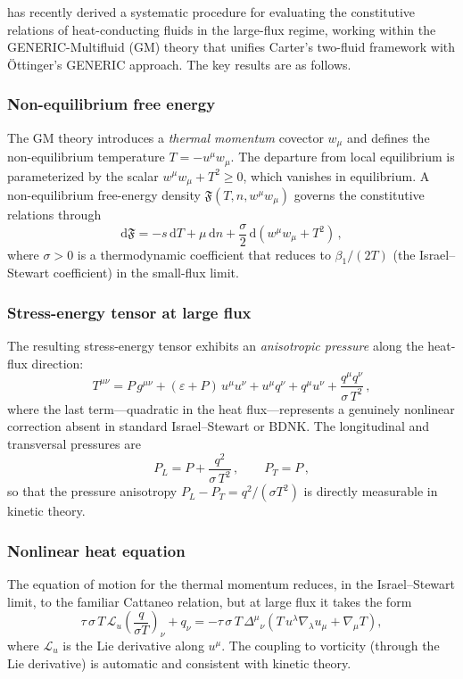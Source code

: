 \citet{GavassinoLargeFlux2024} has recently derived a systematic
procedure for evaluating the constitutive relations of heat-conducting
fluids in the large-flux regime, working within the GENERIC-Multifluid
(GM) theory that unifies Carter's two-fluid framework with
\"Ottinger's GENERIC approach.  The key results are as follows.

\subsubsection{Non-equilibrium free energy}
The GM theory introduces a \emph{thermal momentum} covector $w_\mu$
and defines the non-equilibrium temperature $T = -u^\mu w_\mu$.  The
departure from local equilibrium is parameterized by the scalar
$w^\mu w_\mu + T^2 \ge 0$, which vanishes in equilibrium.  A
non-equilibrium free-energy density $\mathfrak{F}(T, n, w^\mu w_\mu)$
governs the constitutive relations through
\begin{equation}
  \mathrm{d}\mathfrak{F}
  = -s\,\mathrm{d}T + \mu\,\mathrm{d}n
    + \frac{\sigma}{2}\,\mathrm{d}(w^\mu w_\mu + T^2)\,,
  \label{eq:GM-free-energy}
\end{equation}
where $\sigma > 0$ is a thermodynamic coefficient that reduces to
$\beta_1/(2T)$ (the Israel--Stewart coefficient) in the small-flux limit.

\subsubsection{Stress-energy tensor at large flux}
The resulting stress-energy tensor exhibits an \emph{anisotropic pressure}
along the heat-flux direction:
\begin{equation}
  T^{\mu\nu}
  = P\,g^{\mu\nu} + (\varepsilon + P)\,u^\mu u^\nu
    + u^\mu q^\nu + q^\mu u^\nu
    + \frac{q^\mu q^\nu}{\sigma\,T^2}\,,
  \label{eq:GM-Tmunu}
\end{equation}
where the last term---quadratic in the heat flux---represents a
genuinely nonlinear correction absent in standard Israel--Stewart
or BDNK.  The longitudinal and transversal pressures are
\begin{equation}
  P_L = P + \frac{q^2}{\sigma\,T^2}\,,\qquad P_T = P\,,
\end{equation}
so that the pressure anisotropy $P_L - P_T = q^2/(\sigma T^2)$
is directly measurable in kinetic theory.

\subsubsection{Nonlinear heat equation}
The equation of motion for the thermal momentum reduces, in the
Israel--Stewart limit, to the familiar Cattaneo relation, but at
large flux it takes the form
\begin{equation}
  \tau\,\sigma\,T\,\mathcal{L}_u\!\left(\frac{q}{\sigma T}\right)_\nu
  + q_\nu
  = -\tau\,\sigma\,T\,\Delta^{\mu}{}_{\nu}
    \left(T\,u^\lambda\nabla_\lambda u_\mu + \nabla_\mu T\right),
  \label{eq:GM-heat-eq}
\end{equation}
where $\mathcal{L}_u$ is the Lie derivative along $u^\mu$.  The
coupling to vorticity (through the Lie derivative) is automatic and
consistent with kinetic theory.

